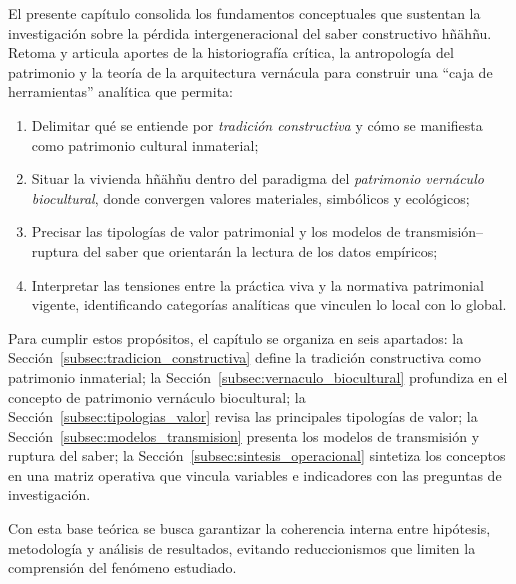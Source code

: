 El presente capítulo consolida los fundamentos conceptuales que sustentan la investigación sobre la pérdida intergeneracional del saber constructivo hñähñu.  Retoma y articula aportes de la historiografía crítica, la antropología del patrimonio y la teoría de la arquitectura vernácula para construir una ``caja de herramientas'' analítica que permita:

\begin{enumerate}
	\item Delimitar qué se entiende por \emph{tradición constructiva} y cómo se manifiesta como patrimonio cultural inmaterial;
	\item Situar la vivienda hñähñu dentro del paradigma del \emph{patrimonio vernáculo biocultural}, donde convergen valores materiales, simbólicos y ecológicos;
	\item Precisar las tipologías de valor patrimonial y los modelos de transmisión–ruptura del saber que orientarán la lectura de los datos empíricos;
	\item Interpretar las tensiones entre la práctica viva y la normativa patrimonial vigente, identificando categorías analíticas que vinculen lo local con lo global.
\end{enumerate}

Para cumplir estos propósitos, el capítulo se organiza en seis apartados: la Sección~\ref{subsec:tradicion_constructiva} define la tradición constructiva como patrimonio inmaterial; la Sección~\ref{subsec:vernaculo_biocultural} profundiza en el concepto de patrimonio vernáculo biocultural; la Sección~\ref{subsec:tipologias_valor} revisa las principales tipologías de valor; la Sección~\ref{subsec:modelos_transmision} presenta los modelos de transmisión y ruptura del saber; la Sección~\ref{subsec:sintesis_operacional} sintetiza los conceptos en una matriz operativa que vincula variables e indicadores con las preguntas de investigación.

Con esta base teórica se busca garantizar la coherencia interna entre hipótesis, metodología y análisis de resultados, evitando reduccionismos que limiten la comprensión del fenómeno estudiado.
